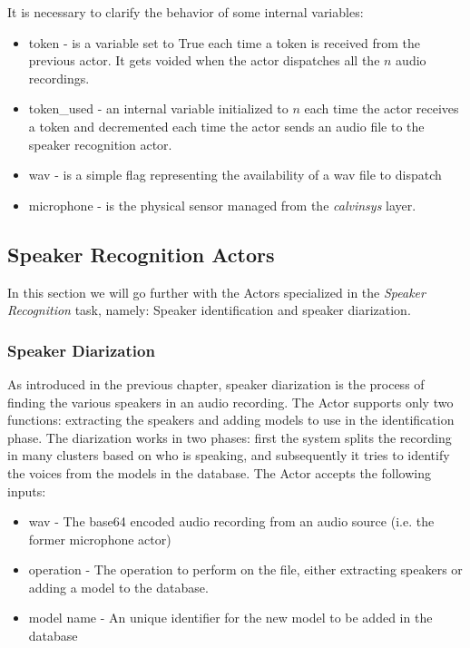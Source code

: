  It is necessary to clarify the behavior of some internal variables:

 \begin{itemize}
     \item token - is a variable set to True each time a token is received from the previous
     actor. It gets voided when the actor dispatches all the $n$ audio recordings.
     \item token\_used - an internal variable initialized to $n$ each time the actor receives
     a token and decremented each time the actor sends an audio file to the speaker recognition actor.
     \item wav - is a simple flag representing the availability of a wav file to dispatch
     \item microphone - is the physical sensor managed from the \textit{calvinsys} layer.
 \end{itemize}

\subsection{Speaker Recognition Actors}

In this section we will go further with the Actors specialized
in the \textit{Speaker Recognition} task, namely: Speaker identification
and speaker diarization.

\subsubsection{Speaker Diarization}

As introduced in the previous chapter, speaker diarization is the process of
finding the various speakers in an audio recording. The Actor supports only two
functions: extracting the speakers and adding models to use in the identification phase.
The diarization works in two phases: first the system splits the recording in many clusters
based on who is speaking, and subsequently it tries to identify the voices from the
models in the database.\newline
The Actor accepts the following inputs:
\begin{itemize}
    \item wav - The base64 encoded audio recording from an audio source (i.e. the former microphone actor)
    \item operation - The operation to perform on the file, either extracting speakers or adding a model to the database.
    \item model name - An unique identifier for the new model to be added in the database
\end{itemize}

